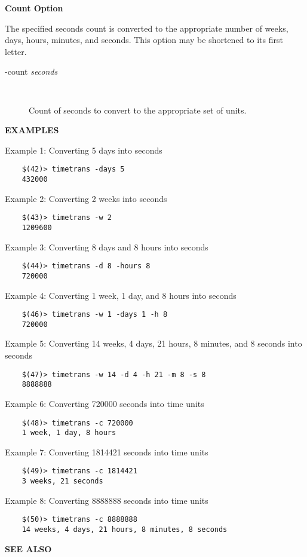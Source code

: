 {\bf Count Option}

The specified seconds count is converted to the appropriate number of weeks,
days, hours, minutes, and seconds.  This option may be shortened to its first
letter.

\begin{description}

\item [-count {\it seconds}]\verb" "

Count of seconds to convert to the appropriate set of units.

\end{description}

{\bf EXAMPLES}

Example 1:  Converting 5 days into seconds

\begin{verbatim}
    $(42)> timetrans -days 5
    432000
\end{verbatim}

Example 2:  Converting 2 weeks into seconds

\begin{verbatim}
    $(43)> timetrans -w 2
    1209600
\end{verbatim}

Example 3:  Converting 8 days and 8 hours into seconds

\begin{verbatim}
    $(44)> timetrans -d 8 -hours 8
    720000
\end{verbatim}

Example 4:  Converting 1 week, 1 day, and 8 hours into seconds

\begin{verbatim}
    $(46)> timetrans -w 1 -days 1 -h 8
    720000
\end{verbatim}

Example 5:  Converting 14 weeks, 4 days, 21 hours, 8 minutes, and 8 seconds into seconds

\begin{verbatim}
    $(47)> timetrans -w 14 -d 4 -h 21 -m 8 -s 8
    8888888
\end{verbatim}

Example 6:  Converting 720000 seconds into time units

\begin{verbatim}
    $(48)> timetrans -c 720000
    1 week, 1 day, 8 hours
\end{verbatim}

Example 7:  Converting 1814421 seconds into time units

\begin{verbatim}
    $(49)> timetrans -c 1814421
    3 weeks, 21 seconds
\end{verbatim}

Example 8:  Converting 8888888 seconds into time units

\begin{verbatim}
    $(50)> timetrans -c 8888888
    14 weeks, 4 days, 21 hours, 8 minutes, 8 seconds
\end{verbatim}

{\bf SEE ALSO}



